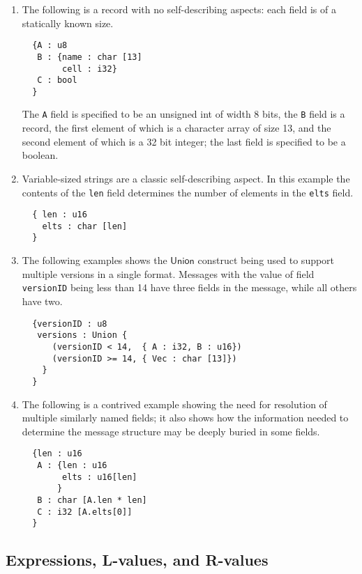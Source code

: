 \documentclass[sigplan,10pt,anonymous,review]{acmart}\settopmatter{printfolios=true,printccs=false,printacmref=false}
\newcommand{\konst}[1]{\ensuremath{\mathsf{#1}}}
\begin{document}
\begin{enumerate}

\item The following is a record with no self-describing aspects: each
  field is of a statically known size.

\begin{verbatim}
  {A : u8
   B : {name : char [13]
        cell : i32}
   C : bool
  }
\end{verbatim}

The \verb+A+ field is specified to be an unsigned int of width 8 bits,
the \verb+B+ field is a record, the first element of which is a
character array of size 13, and the second element of which is a 32
bit integer; the last field is specified to be a
boolean.

\item Variable-sized strings are a classic self-describing aspect. In
  this example the contents of the \verb+len+ field determines the
  number of elements in the \verb+elts+ field.

\begin{verbatim}
  { len : u16
    elts : char [len]
  }
\end{verbatim}


\item The following examples shows the \konst{Union} construct being
  used to support multiple versions in a single format.  Messages with
  the value of field \verb+versionID+ being less than 14 have three
  fields in the message, while all others have two.

\begin{verbatim}
  {versionID : u8
   versions : Union {
      (versionID < 14,  { A : i32, B : u16})
      (versionID >= 14, { Vec : char [13]})
    }
  }
\end{verbatim}

\item The following is a contrived example showing the need for
  resolution of multiple similarly named fields; it also shows how the
  information needed to determine the message structure may be deeply
  buried in some fields.

\begin{verbatim}
  {len : u16
   A : {len : u16
        elts : u16[len]
       }
   B : char [A.len * len]
   C : i32 [A.elts[0]]
  }
\end{verbatim}

\end{enumerate}

\subsection{Expressions, L-values, and R-values}
\end{document}
